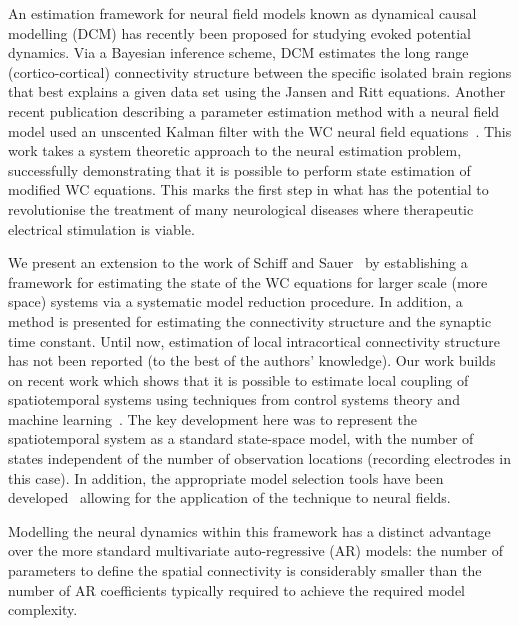 \documentclass[10pt,a4paper]{article}
\begin{document}
An estimation framework for neural field models known as dynamical causal modelling (DCM) \cite{David2003,David2006} has recently been proposed for studying evoked potential dynamics. Via a Bayesian inference scheme, DCM estimates the long range (cortico-cortical) connectivity structure between the specific isolated brain regions that best explains a given data set using the Jansen and Ritt equations. Another recent publication describing a parameter estimation method with a neural field model used an unscented Kalman filter with the WC neural field equations~\cite{schiff2008kalman}. This work takes a system theoretic approach to the neural estimation problem, successfully demonstrating that it is possible to perform state estimation of modified WC equations. This marks the first step in what has the potential to revolutionise the treatment of many neurological diseases where therapeutic electrical stimulation is viable.


We present an extension to the work of Schiff and Sauer~\cite{schiff2008kalman} by establishing a framework for estimating the state of the WC equations for larger scale (more space) systems via a systematic model reduction procedure. In addition, a method is presented for estimating the connectivity structure and the synaptic time constant. Until now, estimation of local intracortical connectivity structure has not been reported (to the best of the authors' knowledge). Our work builds on recent work which shows that it is possible to estimate local coupling of spatiotemporal systems using techniques from control systems theory and machine learning~\cite{Dewar2009}. The key development here was to represent the spatiotemporal system as a standard state-space model, with the number of states independent of the number of observation locations (recording electrodes in this case). In addition, the appropriate model selection tools have been developed~\cite{Scerri2009} allowing for the application of the technique to neural fields. 

Modelling the neural dynamics within this framework has a distinct advantage over the more standard multivariate auto-regressive (AR) models: the number of parameters to define the spatial connectivity is considerably smaller than the number of AR coefficients typically required to achieve the required model complexity. 
\end{document}
